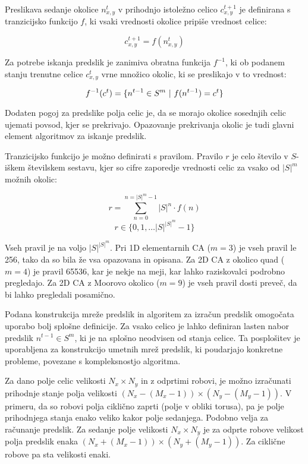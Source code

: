 \documentclass[12pt,a4paper,openany,twoside]{book}
\begin{document}
Preslikava sedanje okolice \(n_{x,y}^{t}\) v prihodnjo istoležno celico \(c_{x,y}^{t+1}\) je definirana
s tranzicijsko funkcijo \(f\), ki vsaki vrednosti okolice pripiše vrednost celice:

\begin{equation}
c_{x,y}^{t+1} = f(n_{x,y}^{t})
\end{equation}

Za potrebe iskanja predslik je zanimiva obratna funkcija \(f^{-1}\), ki ob
podanem stanju trenutne celice \(c_{x,y}^{t}\) vrne množico okolic,
ki se preslikajo v to vrednost:

\begin{equation}
f^{-1}(c^{t}) = \{ n^{t-1} \in S^m \ \arrowvert \ f(n^{t-1}) = c^{t} \}
\end{equation}

Dodaten pogoj za predslike polja celic je, da se morajo okolice sosednjih celic
ujemati povsod, kjer se prekrivajo.
Opazovanje prekrivanja okolic je tudi glavni element algoritmov za iskanje predslik.

Tranzicijsko funkcijo je možno definirati s pravilom.
Pravilo \(r\) je celo število v \(S\)-iškem številskem sestavu,
kjer so cifre zaporedje vrednosti celic za vsako od \(|S|^m\) možnih okolic:

\begin{equation}
r = \sum_{n=0}^{n=|S|^m-1} |S|^n \cdot f(n)
\end{equation}
\begin{equation}
r \in \{0, 1, \dots |S|^{|S|^m}-1\}
\end{equation}

Vseh pravil je na voljo \(|S|^{|S|^m}\).
Pri 1D elementarnih CA (\(m=3\)) je vseh pravil le 256, tako da so bila že vsa opazovana in opisana.
Za 2D CA z okolico quad (\(m=4\)) je pravil 65536, kar je nekje na meji, kar lahko raziskovalci podrobno pregledajo.
Za 2D CA z Moorovo okolico (\(m=9\)) je vseh pravil dosti preveč, da bi lahko pregledali posamično.

Podana konstrukcija mreže predslik in algoritem za izračun predslik omogočata uporabo
bolj splošne definicije. Za vsako celico je lahko definiran lasten nabor predslik \( n^{t-1} \in S^m \),
ki je na splošno neodvisen od stanja celice. Ta posplošitev je uporabljena za konstrukcijo umetnih
mrež predslik, ki poudarjajo konkretne probleme, povezane s kompleksnostjo algoritma.

Za dano polje celic velikosti \(N_x \times N_y\) in z odprtimi robovi,
je možno izračunati prihodnje stanje polja velikosti \((N_x-(M_x-1)) \times (N_y-(M_y-1))\).
V primeru, da so robovi polja ciklično zaprti (polje v obliki torusa),
pa je polje prihodnjega stanja enako veliko kakor polje sedanjega.
Podobno velja za računanje predslik. Za sedanje polje velikosti \(N_x \times N_y\)
je za odprte robove velikost polja predslik enaka \((N_x+(M_x-1)) \times (N_y+(M_y-1))\).
Za ciklične robove pa sta velikosti enaki.
\end{document}
